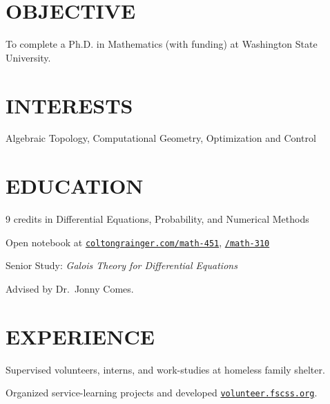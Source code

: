 \documentclass[margin]{res}
\begin{document}
\begin{resume}

\printheader
\section{OBJECTIVE}

To complete a Ph.D. in Mathematics (with funding) at Washington State University.

\section{INTERESTS}

Algebraic Topology, Computational Geometry, Optimization and Control 

\section{EDUCATION}

\begin{details}
\item 9 credits in Differential Equations, Probability, and Numerical Methods
\item Open notebook at \href{http://coltongrainger.com/math-451}{\texttt{coltongrainger.com/math-451}}, \href{http://coltongrainger.com/math-310}{\texttt{/math-310}}
\end{details}

\begin{details}
\item Senior Study: \emph{Galois Theory for Differential Equations}
\item Advised by Dr.~Jonny Comes.
\end{details}

\section{EXPERIENCE}

\begin{details}
\item{Supervised volunteers, interns, and work-studies at homeless family shelter.}
\item{Organized service-learning projects and developed \href{http://volunteer.fscss.org}{\texttt{volunteer.fscss.org}}.}
\end{details}


\end{resume}
\end{document}
